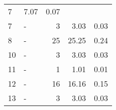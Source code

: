 \begin{longtable}{lXrrr}
       \num{7} &
       \num[round-mode=places,round-precision=2]{7.07} &
         \num[round-mode=places,round-precision=2]{0.07} \\

     7 &
     \multicolumn{1}{X}{ -  } &


       \num{3} &
       \num[round-mode=places,round-precision=2]{3.03} &
         \num[round-mode=places,round-precision=2]{0.03} \\

     8 &
     \multicolumn{1}{X}{ -  } &


       \num{25} &
       \num[round-mode=places,round-precision=2]{25.25} &
         \num[round-mode=places,round-precision=2]{0.24} \\

     10 &
     \multicolumn{1}{X}{ -  } &


       \num{3} &
       \num[round-mode=places,round-precision=2]{3.03} &
         \num[round-mode=places,round-precision=2]{0.03} \\

     11 &
     \multicolumn{1}{X}{ -  } &


       \num{1} &
       \num[round-mode=places,round-precision=2]{1.01} &
         \num[round-mode=places,round-precision=2]{0.01} \\

     12 &
     \multicolumn{1}{X}{ -  } &


       \num{16} &
       \num[round-mode=places,round-precision=2]{16.16} &
         \num[round-mode=places,round-precision=2]{0.15} \\

     13 &
     \multicolumn{1}{X}{ -  } &


       \num{3} &
       \num[round-mode=places,round-precision=2]{3.03} &
         \num[round-mode=places,round-precision=2]{0.03} \\


\end{longtable}
